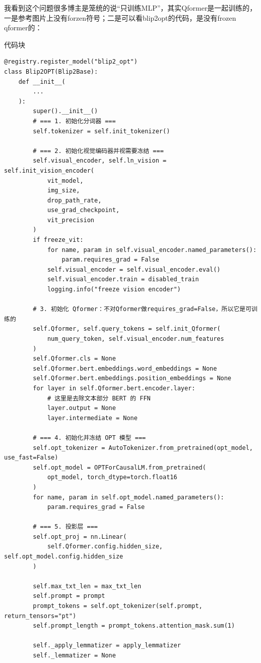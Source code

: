 \documentclass[zihao=false,fontset=windows]{ctexart}
\newcommand{\codehead}{{\small\ttfamily\color{feishuGray}代码块}\par\vspace{-0.15em}}
\begin{document}
\par\vspace{0.6em}\par\vspace{0.2em}

我看到这个问题很多博主是笼统的说“只训练MLP”，其实Qformer是一起训练的，一是参考图片上没有forzen符号；二是可以看blip2opt的代码，是没有frozen qformer的：\par

\begin{feishucode}
\codehead
\begin{lstlisting}
@registry.register_model("blip2_opt")
class Blip2OPT(Blip2Base):
    def __init__(
        ...
    ):
        super().__init__()
        # === 1. 初始化分词器 ===
        self.tokenizer = self.init_tokenizer()

        # === 2. 初始化视觉编码器并视需要冻结 ===
        self.visual_encoder, self.ln_vision = self.init_vision_encoder(
            vit_model,
            img_size,
            drop_path_rate,
            use_grad_checkpoint,
            vit_precision
        )
        if freeze_vit:
            for name, param in self.visual_encoder.named_parameters():
                param.requires_grad = False
            self.visual_encoder = self.visual_encoder.eval()
            self.visual_encoder.train = disabled_train
            logging.info("freeze vision encoder")

        # 3. 初始化 Qformer：不对Qformer做requires_grad=False，所以它是可训练的 
        self.Qformer, self.query_tokens = self.init_Qformer(
            num_query_token, self.visual_encoder.num_features
        )
        self.Qformer.cls = None
        self.Qformer.bert.embeddings.word_embeddings = None
        self.Qformer.bert.embeddings.position_embeddings = None
        for layer in self.Qformer.bert.encoder.layer:
            # 这里是去除文本部分 BERT 的 FFN
            layer.output = None
            layer.intermediate = None

        # === 4. 初始化并冻结 OPT 模型 ===
        self.opt_tokenizer = AutoTokenizer.from_pretrained(opt_model, use_fast=False)
        self.opt_model = OPTForCausalLM.from_pretrained(
            opt_model, torch_dtype=torch.float16
        )
        for name, param in self.opt_model.named_parameters():
            param.requires_grad = False

        # === 5. 投影层 ===
        self.opt_proj = nn.Linear(
            self.Qformer.config.hidden_size, self.opt_model.config.hidden_size
        )

        self.max_txt_len = max_txt_len
        self.prompt = prompt
        prompt_tokens = self.opt_tokenizer(self.prompt, return_tensors="pt")
        self.prompt_length = prompt_tokens.attention_mask.sum(1)

        self._apply_lemmatizer = apply_lemmatizer
        self._lemmatizer = None
\end{lstlisting}
\end{feishucode}
\end{document}
